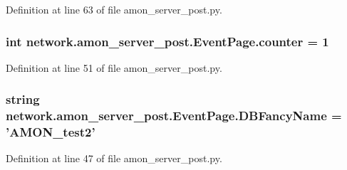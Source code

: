 Definition at line 63 of file amon\-\_\-server\-\_\-post.\-py.

\hypertarget{classnetwork_1_1amon__server__post_1_1_event_page_aa2d1165df8829699de38f4047d8d9b3c}{
\subsubsection[{counter}]{\setlength{\rightskip}{0pt plus 5cm}int network.\-amon\-\_\-server\-\_\-post.\-Event\-Page.\-counter = 1\hspace{0.3cm}{\ttfamily [static]}}}\label{classnetwork_1_1amon__server__post_1_1_event_page_aa2d1165df8829699de38f4047d8d9b3c}


Definition at line 51 of file amon\-\_\-server\-\_\-post.\-py.

\hypertarget{classnetwork_1_1amon__server__post_1_1_event_page_ab13a95bbc99fa0136f178e8dfb59a32d}{
\subsubsection[{D\-B\-Fancy\-Name}]{\setlength{\rightskip}{0pt plus 5cm}string network.\-amon\-\_\-server\-\_\-post.\-Event\-Page.\-D\-B\-Fancy\-Name = '{\bf A\-M\-O\-N\-\_\-test2}'\hspace{0.3cm}{\ttfamily [static]}}}\label{classnetwork_1_1amon__server__post_1_1_event_page_ab13a95bbc99fa0136f178e8dfb59a32d}


Definition at line 47 of file amon\-\_\-server\-\_\-post.\-py.


